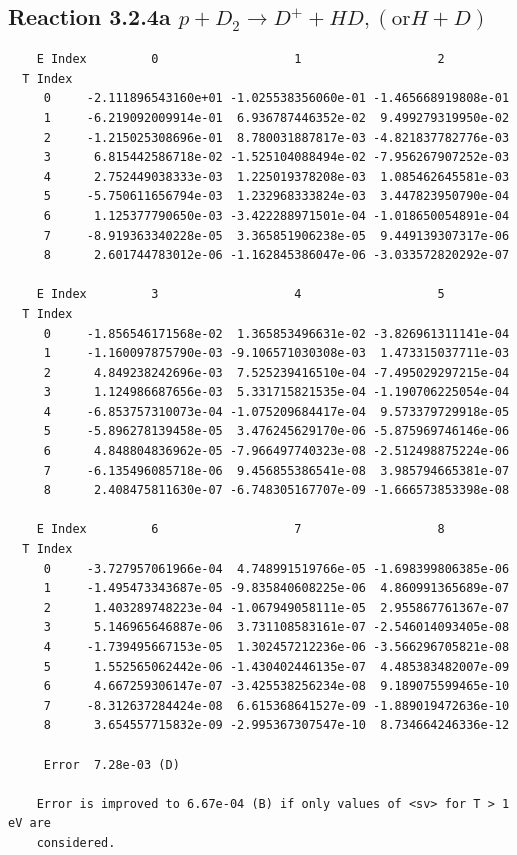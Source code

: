 \documentclass[12pt,dvipdfmx]{article}
\begin{document}
\newpage
\subsection{
Reaction 3.2.4a $  p + D_2 \rightarrow D^+ + HD, (\mbox{or} H + D)$}


\begin{small}\begin{verbatim}
    E Index         0                   1                   2
  T Index
     0     -2.111896543160e+01 -1.025538356060e-01 -1.465668919808e-01
     1     -6.219092009914e-01  6.936787446352e-02  9.499279319950e-02
     2     -1.215025308696e-01  8.780031887817e-03 -4.821837782776e-03
     3      6.815442586718e-02 -1.525104088494e-02 -7.956267907252e-03
     4      2.752449038333e-03  1.225019378208e-03  1.085462645581e-03
     5     -5.750611656794e-03  1.232968333824e-03  3.447823950790e-04
     6      1.125377790650e-03 -3.422288971501e-04 -1.018650054891e-04
     7     -8.919363340228e-05  3.365851906238e-05  9.449139307317e-06
     8      2.601744783012e-06 -1.162845386047e-06 -3.033572820292e-07

    E Index         3                   4                   5
  T Index
     0     -1.856546171568e-02  1.365853496631e-02 -3.826961311141e-04
     1     -1.160097875790e-03 -9.106571030308e-03  1.473315037711e-03
     2      4.849238242696e-03  7.525239416510e-04 -7.495029297215e-04
     3      1.124986687656e-03  5.331715821535e-04 -1.190706225054e-04
     4     -6.853757310073e-04 -1.075209684417e-04  9.573379729918e-05
     5     -5.896278139458e-05  3.476245629170e-06 -5.875969746146e-06
     6      4.848804836962e-05 -7.966497740323e-08 -2.512498875224e-06
     7     -6.135496085718e-06  9.456855386541e-08  3.985794665381e-07
     8      2.408475811630e-07 -6.748305167707e-09 -1.666573853398e-08

    E Index         6                   7                   8
  T Index
     0     -3.727957061966e-04  4.748991519766e-05 -1.698399806385e-06
     1     -1.495473343687e-05 -9.835840608225e-06  4.860991365689e-07
     2      1.403289748223e-04 -1.067949058111e-05  2.955867761367e-07
     3      5.146965646887e-06  3.731108583161e-07 -2.546014093405e-08
     4     -1.739495667153e-05  1.302457212236e-06 -3.566296705821e-08
     5      1.552565062442e-06 -1.430402446135e-07  4.485383482007e-09
     6      4.667259306147e-07 -3.425538256234e-08  9.189075599465e-10
     7     -8.312637284424e-08  6.615368641527e-09 -1.889019472636e-10
     8      3.654557715832e-09 -2.995367307547e-10  8.734664246336e-12

     Error  7.28e-03 (D)

    Error is improved to 6.67e-04 (B) if only values of <sv> for T > 1 eV are
    considered.
\end{verbatim}\end{small}
\end{document}

